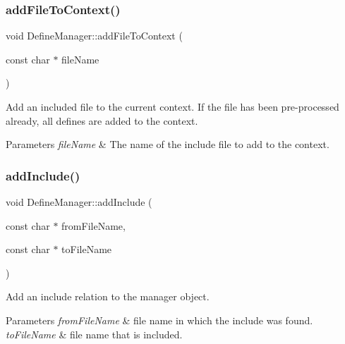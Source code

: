 \subsubsection{\texorpdfstring{addFileToContext()}{addFileToContext()}}
{\footnotesize\ttfamily void Define\+Manager\+::add\+File\+To\+Context (\begin{DoxyParamCaption}\item[{const char $\ast$}]{file\+Name }\end{DoxyParamCaption})\hspace{0.3cm}{\ttfamily [inline]}}

Add an included file to the current context. If the file has been pre-\/processed already, all defines are added to the context. 
\begin{DoxyParams}{Parameters}
{\em file\+Name} & The name of the include file to add to the context. \\
\hline
\end{DoxyParams}
\mbox{\label{class_define_manager_ad7fc54954b0c4e8896354bcf5449c188}} 
\subsubsection{\texorpdfstring{addInclude()}{addInclude()}}
{\footnotesize\ttfamily void Define\+Manager\+::add\+Include (\begin{DoxyParamCaption}\item[{const char $\ast$}]{from\+File\+Name,  }\item[{const char $\ast$}]{to\+File\+Name }\end{DoxyParamCaption})\hspace{0.3cm}{\ttfamily [inline]}}

Add an include relation to the manager object. 
\begin{DoxyParams}{Parameters}
{\em from\+File\+Name} & file name in which the include was found. \\
\hline
{\em to\+File\+Name} & file name that is included. \\
\hline
\end{DoxyParams}
\mbox{\label{class_define_manager_a6cf93557f46a0954b771af4f21acba6a}} 
